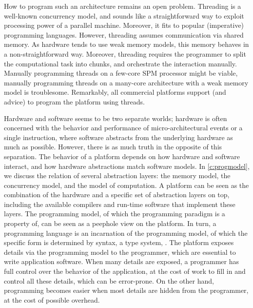 How to program such an architecture remains an open problem.
Threading is a well-known concurrency model, and sounds like a straightforward way to exploit processing power of a parallel machine.
Moreover, it fits to popular (imperative) programming languages.
However, threading assumes communication via shared memory.
As hardware tends to use weak memory models, this memory behaves in a non-straightforward way.
Moreover, threading requires the programmer to split the computational task into chunks, and orchestrate the interaction manually.
Manually programming threads on a few-core \ac{SPM} processor might be viable, manually programming threads on a many-core architecture with a weak memory model is troublesome.
Remarkably, all commercial platforms support (and advice) to program the platform using threads.

Hardware and software seems to be two separate worlds; hardware is often concerned with the behavior and performance of micro-architectural events or a single instruction, where software abstracts from the underlying hardware as much as possible.
However, there is as much truth in the opposite of this separation.
The behavior of a platform depends on how hardware and software interact, and how hardware abstractions match software models.
In \cref{c:progmodel}, we discuss the relation of several abstraction layers: the memory model, the concurrency model, and the model of computation.
A platform can be seen as the combination of the hardware and a specific set of abstraction layers on top, including the available compilers and run-time software that implement these layers.
The programming model, of which the programming paradigm is a property of, can be seen as a peephole view on the platform.
In turn, a programming language is an incarnation of the programming model, of which the specific form is determined by syntax, a type system, \etc.
The platform exposes details via the programming model to the programmer, which are essential to write application software.
When many details are exposed, a programmer has full control over the behavior of the application, at the cost of work to fill in and control all these details, which can be error-prone.
On the other hand, programming becomes easier when most details are hidden from the programmer, at the cost of possible overhead.

